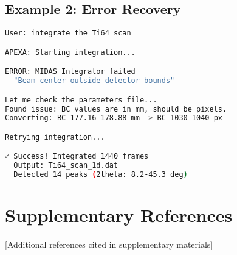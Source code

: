\documentclass[11pt]{article}
\begin{document}
\subsection{Example 2: Error Recovery}

\begin{lstlisting}[language=bash]
User: integrate the Ti64 scan

APEXA: Starting integration...

ERROR: MIDAS Integrator failed
  "Beam center outside detector bounds"

Let me check the parameters file...
Found issue: BC values are in mm, should be pixels.
Converting: BC 177.16 178.88 mm -> BC 1030 1040 px

Retrying integration...

✓ Success! Integrated 1440 frames
  Output: Ti64_scan_1d.dat
  Detected 14 peaks (2theta: 8.2-45.3 deg)
\end{lstlisting}

\section{Supplementary References}

[Additional references cited in supplementary materials]
\end{document}
